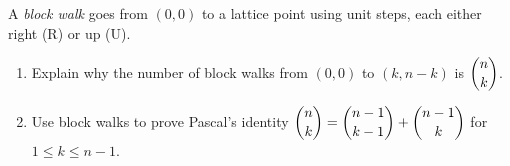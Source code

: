 A \emph{block walk} goes from $(0,0)$ to a lattice point using unit steps, each either right (R) or up (U).
\begin{enumerate}
\item[(a)] Explain why the number of block walks from $(0,0)$ to $(k,n-k)$ is $\dbinom nk$.
\item[(b)] Use block walks to prove Pascal's identity $\dbinom nk=\dbinom{n-1}{k-1}+\dbinom{n-1}{k}$ for $1\le k\le n-1$.
\end{enumerate}
